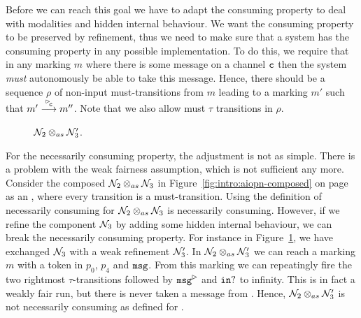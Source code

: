 Before we can reach this goal we have to adapt the consuming property to deal with modalities and hidden internal behaviour. We want the consuming property to be preserved by refinement, thus we need to make sure that a system has the consuming property in any possible implementation. To do this, we require that in any marking $m$ where there is some message on a channel $\mathtt{c}$ then the system \emph{must} autonomously be able to take this message. Hence, there should be a sequence $\rho$ of non-input must-transitions from $m$ leading to a marking $m'$ such that $m'\goes{\transition{\inact{c}}}m''$. Note that we also allow must $\tau$ transitions in $\rho$. 

\begin{figure}[ht]
\centering
    
    \caption{\MAIOPN $\mathcal{N}_2 \otimes_{as} \mathcal{N}'_3$.\label{fig:intro:maiopn-example-fairness}}
\end{figure}

For the necessarily consuming property, the adjustment is not as simple. There is a problem with the weak fairness assumption, which is not sufficient any more. Consider the composed \AIOPN $\mathcal{N}_2 \otimes_{as} \mathcal{N}_3$ in Figure~\ref{fig:intro:aiopn-composed} on page~\pageref{fig:intro:aiopn-composed} as an \MAIOPN, where every transition is a must-transition. Using the definition of necessarily consuming for \AIOPN $\mathcal{N}_2 \otimes_{as} \mathcal{N}_3$ is necessarily consuming. However, if we refine the component $\mathcal{N}_3$ by adding some hidden internal behaviour, we can break the necessarily consuming property. For instance in Figure~\ref{fig:intro:maiopn-example-fairness}, we have exchanged $\mathcal{N}_3$ with a weak refinement $\mathcal{N}_3'$. In $\mathcal{N}_2 \otimes_{as} \mathcal{N}'_3$ we can reach a marking $m$ with a token in $p_0$, $p_4$ and $\mathtt{msg}$. From this marking we can repeatingly fire the two rightmost $\tau$-transitions followed by $\transition{\outact{msg}}$ and $\mathtt{in?}$ to infinity. This is in fact a weakly fair run, but there is never taken a message from . Hence, $\mathcal{N}_2 \otimes_{as} \mathcal{N}'_3$ is not necessarily consuming as defined for \AIOPNs.

